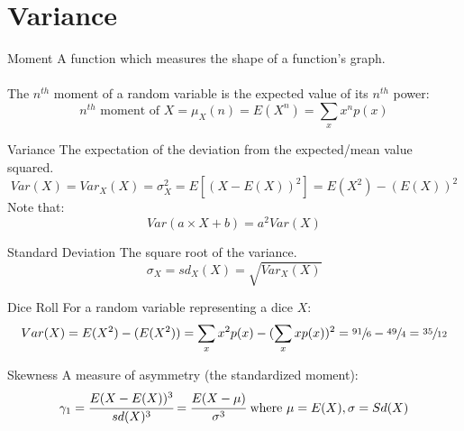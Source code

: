 \section{Variance}
\begin{definitionbox}{Moment}
	A function which measures the shape of a function's graph.
	\\
	\\ The $n^{th}$ moment of a random variable is the expected value of its $n^{th}$ power:
	\[n^{th}\text{ moment of $X$} = \mu_X(n) = E(X^n) = \sum_xx^np(x)\]
	\begin{itemize}
	\end{itemize}
\end{definitionbox}
\begin{definitionbox}{Variance}
	The expectation of the deviation from the expected/mean value squared.
	\[Var(X) = Var_X(X) = \sigma_X^2 = E[(X - E(X))^2] = E(X^2) - (E(X))^2\]
	Note that:
	\[Var(a \times X + b) = a^2Var(X)\]
\end{definitionbox}
\begin{definitionbox}{Standard Deviation}
	The square root of the variance.
	\[\sigma_X = sd_X(X) = \sqrt{Var_X(X)}\]
\end{definitionbox}
\begin{examplebox}{Dice Roll}
	For a random variable representing a dice $X$:
	\[Var(X) = E(X^2) - (E(X^2)) = \sum_xx^2p(x) - (\sum_xxp(x))^2 = \sfrac{91}{6} - \sfrac{49}{4} = \sfrac{35}{12}\]
\end{examplebox}
\begin{definitionbox}{Skewness}
	A measure of asymmetry (the standardized moment):
	\[\gamma_1 = \cfrac{E(X - E(X))^3}{sd(X)^3} = \cfrac{E(X - \mu)}{\sigma^3} \text{ where } \mu = E(X), \sigma = Sd(X)\]
\end{definitionbox}

